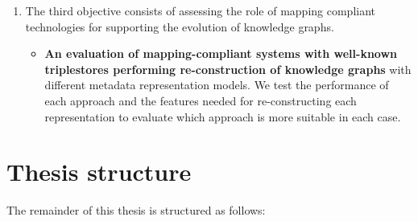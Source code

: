 \begin{enumerate}
    \item The third objective consists of assessing the role of mapping compliant technologies for supporting the evolution of knowledge graphs.

    \begin{itemize}
        \item \textbf{An evaluation of mapping-compliant systems with well-known triplestores performing re-construction of knowledge graphs} with different metadata representation models. We test the performance of each approach and the features needed for re-constructing each representation to evaluate which approach is more suitable in each case. 
    \end{itemize}
\end{enumerate}


\section{Thesis structure}

The remainder of this thesis is structured as follows:

